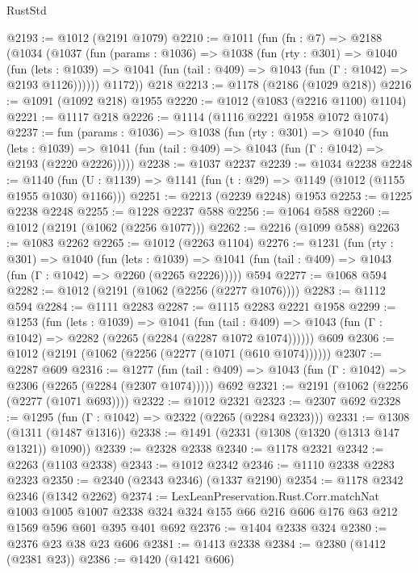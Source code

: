 \begin{lexlean}{RustStd}
\begin{coremodule}
@2193 := @1012 (@2191 @1079)
@2210 := @1011
    (fun (fn : @7) =>
    @2188
      (@1034
        (@1037
          (fun (params : @1036) =>
          @1038
            (fun (rty : @301) =>
            @1040
              (fun (lets : @1039) =>
              @1041 (fun (tail : @409) => @1043 (fun (Γ : @1042) => @2193 @1126))))))
        @1172))
    @218
@2213 := @1178 (@2186 (@1029 @218))
@2216 := @1091 (@1092 @218) @1955
@2220 := @1012 (@1083 (@2216 @1100) @1104)
@2221 := @1117 @218
@2226 := @1114 (@1116 @2221 @1958 @1072 @1074)
@2237 := fun (params : @1036) =>
  @1038
    (fun (rty : @301) =>
    @1040
      (fun (lets : @1039) =>
      @1041 (fun (tail : @409) => @1043 (fun (Γ : @1042) => @2193 (@2220 @2226)))))
@2238 := @1037 @2237
@2239 := @1034 @2238
@2248 := @1140 (fun (U : @1139) => @1141 (fun (t : @29) => @1149 (@1012 (@1155 @1955 @1030) @1166)))
@2251 := @2213 (@2239 @2248) @1953
@2253 := @1225 @2238 @2248
@2255 := @1228 @2237 @588
@2256 := @1064 @588
@2260 := @1012 (@2191 (@1062 (@2256 @1077)))
@2262 := @2216 (@1099 @588)
@2263 := @1083 @2262
@2265 := @1012 (@2263 @1104)
@2276 := @1231
    (fun (rty : @301) =>
    @1040
      (fun (lets : @1039) =>
      @1041 (fun (tail : @409) => @1043 (fun (Γ : @1042) => @2260 (@2265 @2226)))))
    @594
@2277 := @1068 @594
@2282 := @1012 (@2191 (@1062 (@2256 (@2277 @1076))))
@2283 := @1112 @594
@2284 := @1111 @2283
@2287 := @1115 @2283 @2221 @1958
@2299 := @1253
    (fun (lets : @1039) =>
    @1041
      (fun (tail : @409) => @1043 (fun (Γ : @1042) => @2282 (@2265 (@2284 (@2287 @1072 @1074))))))
    @609
@2306 := @1012 (@2191 (@1062 (@2256 (@2277 (@1071 (@610 @1074))))))
@2307 := @2287 @609
@2316 := @1277
    (fun (tail : @409) => @1043 (fun (Γ : @1042) => @2306 (@2265 (@2284 (@2307 @1074)))))
    @692
@2321 := @2191 (@1062 (@2256 (@2277 (@1071 @693))))
@2322 := @1012 @2321
@2323 := @2307 @692
@2328 := @1295 (fun (Γ : @1042) => @2322 (@2265 (@2284 @2323)))
@2331 := @1308 (@1311 (@1487 @1316))
@2338 := @1491 (@2331 (@1308 (@1320 (@1313 @147 @1321)) @1090))
@2339 := @2328 @2338
@2340 := @1178 @2321
@2342 := @2263 (@1103 @2338)
@2343 := @1012 @2342
@2346 := @1110 @2338 @2283 @2323
@2350 := @2340 (@2343 @2346) (@1337 @2190)
@2354 := @1178 @2342 @2346 (@1342 @2262)
@2374 := LexLeanPreservation.Rust.Corr.matchNat
    @1003
    @1005
    @1007
    @2338
    @324
    @324
    @155
    @66
    @216
    @606
    @176
    @63
    @212
    @1569
    @596
    @601
    @395
    @401
    @692
@2376 := @1404 @2338 @324
@2380 := @2376 @23 @38 @23 @606
@2381 := @1413 @2338
@2384 := @2380 (@1412 (@2381 @23))
@2386 := @1420 (@1421 @606)

\end{coremodule}
\end{lexlean}
